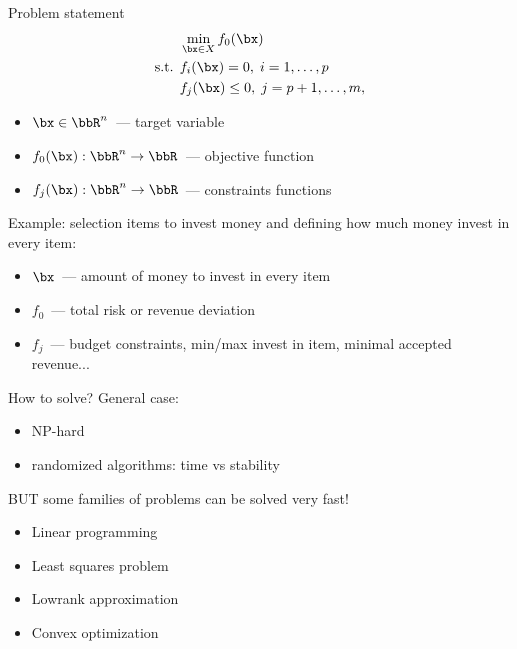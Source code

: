 \documentclass[12pt]{beamer}
\begin{document}
\begin{frame}{Problem statement}
\begin{equation*}
\begin{split}
&\min\limits_{\bx \in X} f_0(\bx)\\
\text{s.t. } & f_i(\bx) = 0, \; i = 1,\ldots,p\\
& f_j(\bx) \leq 0, \; j = p+1,\ldots,m,
\end{split}
\end{equation*}
\begin{itemize}
\item $\bx \in \bbR^n$~--- target variable
\item $f_0(\bx): \bbR^n \rightarrow \bbR$~--- objective function
\item $f_j(\bx): \bbR^n \rightarrow \bbR$~--- constraints functions
\end{itemize}
Example: selection items to invest money and defining how much money invest in every item:
\begin{itemize}
\item $\bx$~--- amount of money to invest in every item
\item $f_0$~--- total risk or revenue deviation
\item $f_j$~--- budget constraints, min/max invest in item, minimal accepted revenue...
\end{itemize}

\end{frame}

\begin{frame}{How to solve?}
General case:
\begin{itemize}
\item NP-hard
\item {\small randomized algorithms: time vs stability}
\end{itemize}

{\small BUT some families of problems can be solved very fast!}

\begin{itemize}
\item Linear programming
\item Least squares problem
\item Lowrank approximation
\item Convex optimization
\end{itemize}
\end{frame}
\end{document}
